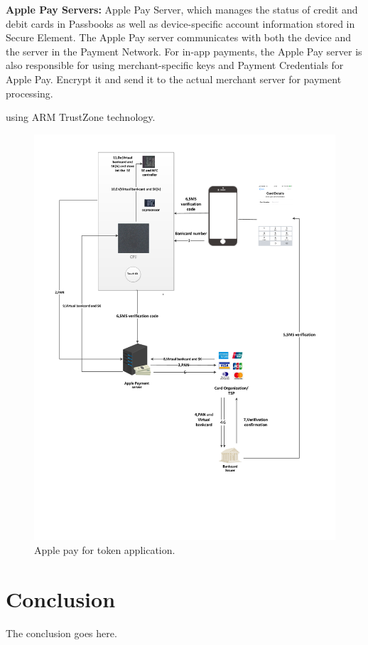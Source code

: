 \documentclass[journal]{IEEEtran}
\begin{document}
    \textbf{Apple Pay Servers:} Apple Pay Server, which manages the status of credit and debit cards in Passbooks as well as device-specific account information stored in Secure Element. The Apple Pay server communicates with both the device and the server in the Payment Network. For in-app payments, the Apple Pay server is also responsible for using merchant-specific keys and Payment Credentials for Apple Pay. Encrypt it and send it to the actual merchant server for payment processing.

 using ARM TrustZone technology.

\begin{figure}[htbp]
\centerline{\includegraphics[scale=0.6]{iphone_tsp.pdf}}
\caption{Apple pay for token application.}
\label{fig}
\end{figure}





\section{Conclusion}
The conclusion goes here.
\end{document}
